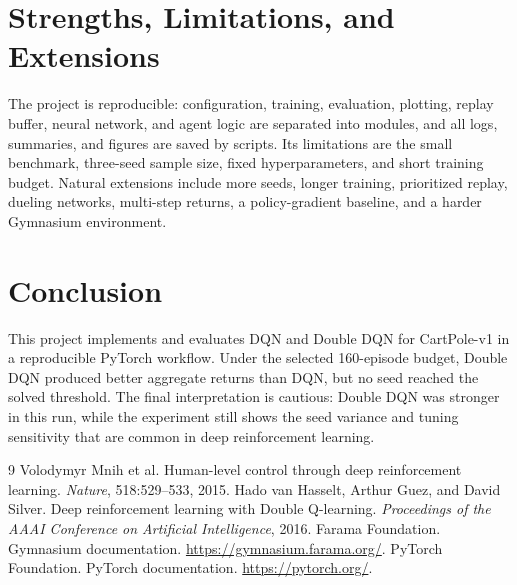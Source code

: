\documentclass{article}
\begin{document}
\section{Strengths, Limitations, and Extensions} The project is reproducible: configuration, training, evaluation, plotting, replay buffer, neural network, and agent logic are separated into modules, and all logs, summaries, and figures are saved by scripts. Its limitations are the small benchmark, three-seed sample size, fixed hyperparameters, and short training budget. Natural extensions include more seeds, longer training, prioritized replay, dueling networks, multi-step returns, a policy-gradient baseline, and a harder Gymnasium environment.
\section{Conclusion} This project implements and evaluates DQN and Double DQN for CartPole-v1 in a reproducible PyTorch workflow. Under the selected 160-episode budget, Double DQN produced better aggregate returns than DQN, but no seed reached the solved threshold. The final interpretation is cautious: Double DQN was stronger in this run, while the experiment still shows the seed variance and tuning sensitivity that are common in deep reinforcement learning.
\begin{thebibliography}{9}  Volodymyr Mnih et al. Human-level control through deep reinforcement learning. \emph{Nature}, 518:529--533, 2015.  Hado van Hasselt, Arthur Guez, and David Silver. Deep reinforcement learning with Double Q-learning. \emph{Proceedings of the AAAI Conference on Artificial Intelligence}, 2016.  Farama Foundation. Gymnasium documentation. \url{https://gymnasium.farama.org/}.  PyTorch Foundation. PyTorch documentation. \url{https://pytorch.org/}. \end{thebibliography} 
\end{document}
